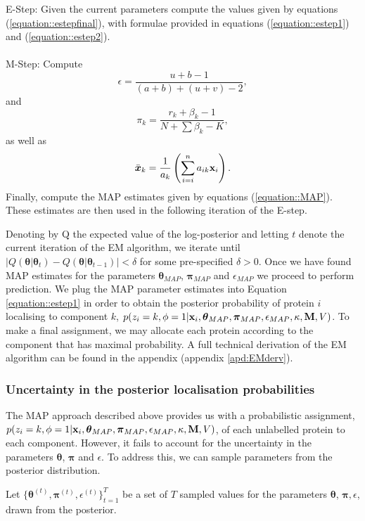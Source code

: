 \documentclass[12pt,english]{article}
\begin{document}
E-Step: Given the current parameters compute the values given by equations (\ref{equation::estepfinal}),
with formulae provided in equations (\ref{equation::estep1}) and (\ref{equation::estep2}).
\\
\\
M-Step:
Compute
\[\epsilon = \frac{ u + b - 1}{(a+b) + (u+v) - 2},\]
and
\[\pi_k = \frac{r_k + \beta_k - 1}{N + \sum \beta_k - K},\]
as well as
\[\bar{\boldsymbol{x}}_k = \frac{1}{a_k}\left(\sum_{i=i}^{n}a_{ik}{\bf x}_i\right).\]
Finally, compute the MAP estimates given by equations (\ref{equation::MAP}). These estimates are then used in the following iteration of the E-step.


Denoting by Q the expected value of the log-posterior and letting $t$ denote the current iteration of the EM algorithm, we iterate
until $\lvert Q(\boldsymbol{\theta}|\boldsymbol{\theta}_{t}) - Q(\boldsymbol{\theta}|\boldsymbol{\theta}_{t-1})\rvert < \delta$ for some pre-specified $\delta >0$.
Once we have found MAP estimates for the parameters
$\boldsymbol{\theta}_{MAP}$, $\boldsymbol{\pi}_{MAP}$ and $\epsilon_{MAP}$ we proceed to perform prediction. We plug the MAP parameter estimates into Equation \eqref{equation::estep1} in order to obtain the posterior probability of protein $i$ localising to component $k$, $p(z_i = k, \phi = 1 | {\bf x}_i, \boldsymbol{\theta}_{MAP}, \boldsymbol{\pi}_{MAP} , \epsilon_{MAP},\kappa, {\bf M}, V)$. To make a final assignment, we may allocate each protein according to the component that has maximal probability.
A full technical derivation of the EM algorithm can be found in the appendix (appendix \ref{apd:EMderv}).

\subsubsection{Uncertainty in the posterior localisation probabilities}\label{section::MCMC}
The MAP approach described above provides us with a probabilistic assignment, $p(z_i = k, \phi = 1 | {\bf x}_i, \boldsymbol{\theta}_{MAP}, \boldsymbol{\pi}_{MAP} , \epsilon_{MAP},\kappa, {\bf M}, V)$, of each unlabelled protein to each component.  However, it fails to account for the uncertainty in the parameters $\boldsymbol{\theta}$, $\boldsymbol{\pi}$ and $\epsilon$. To address this, we can sample parameters from the posterior distribution.

Let $\{\boldsymbol{\theta}^{(t)},  \boldsymbol{\pi}^{(t)}, \epsilon^{(t)}\}_{t=1}^T$ be a set of $T$ sampled values for the parameters $\boldsymbol{\theta}$, $\boldsymbol{\pi}, \epsilon$, drawn from the posterior.
\end{document}
